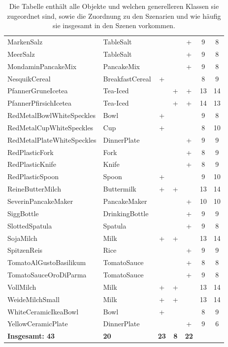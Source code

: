 \begin{table}
\begin{tabularx}{\textwidth}{llccccc}
MarkenSalz						& TableSalt			& 			& 			&	+		& 9		& 8	\\
MeerSalz						& TableSalt			& 			& 			&	+		& 9		& 8	\\
MondaminPancakeMix				& PancakeMix		& 			& 			&	+		& 9		& 8	\\
NesquikCereal					& BreakfastCereal	& +			& 			&			& 8		& 9	\\
PfannerGruneIcetea				& Tea-Iced			& 			& +			&	+		& 13	& 14\\
PfannerPfirsichIcetea			& Tea-Iced			& 			& +			&	+		& 14	& 13\\
RedMetalBowlWhiteSpeckles		& Bowl				& +			& 			&			& 9		& 8\\
RedMetalCupWhiteSpeckles		& Cup				& +			& 			&			& 8		& 10\\
RedMetalPlateWhiteSpeckles		& DinnerPlate		& 			& 			&	+		& 9		& 9\\
RedPlasticFork					& Fork				& 			& 			&	+		& 8		& 9\\
RedPlasticKnife					& Knife				& 			& 			&	+		& 8		& 9\\
RedPlasticSpoon					& Spoon				& +			& 			&			& 9		& 10\\
ReineButterMilch				& Buttermilk		& +			& +			&			& 13	& 14\\
SeverinPancakeMaker				& PancakeMaker		& 			& 			&	+		& 10	& 10\\
SiggBottle						& DrinkingBottle	& 			& 			&	+		& 9		& 9\\
SlottedSpatula					& Spatula			& 			& 			&	+		& 9		& 8\\
SojaMilch						& Milk				& +			& +			&			& 13	& 14\\
SpitzenReis						& Rice				& 			& 			&	+		& 9		& 9\\
TomatoAlGustoBasilikum			& TomatoSauce		& 			& 			&	+		& 8		& 8\\
TomatoSauceOroDiParma			& TomatoSauce		& 			& 			&	+		& 9		& 8\\
VollMilch						& Milk				& +			& +			&			& 13	& 14\\
WeideMilchSmall					& Milk				& +			& +			&			& 13	& 14\\
WhiteCeramicIkeaBowl			& Bowl				& +			& 			&			& 8		& 9\\
YellowCeramicPlate				& DinnerPlate 	    & 			& 			&	+		& 9		& 6\\ \hline
\textbf{Insgesamt: 43}				& \textbf{20}		& \textbf{23} & \textbf{8} & \textbf{22} & & \\
\end{tabularx}
\caption[Objekte und ihre Verteilung in den Szenen]{Die Tabelle enthält alle Objekte und welchen generelleren Klassen sie zugeordnet sind, sowie die Zuordnung zu den Szenarien und wie häufig sie insgesamt in den Szenen vorkommen.}
\label{tab:objects}
\end{table}